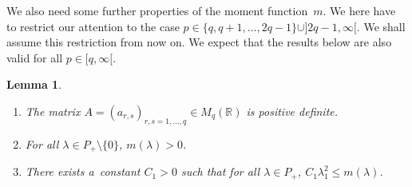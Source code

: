 \documentclass[pdftex]{sigma}
\numberwithin{equation}{section}
\newtheorem{Lemma}[Theorem]{Lemma}
\begin{document}
We also need some further properties of the moment function~$m$.
We here have to restrict our attention to the case $p\in \{q,q+1,\ldots,2q-1\}\cup]2q-1,\infty[$.
We shall assume this restriction from now on.
We expect that the results below are also valid for all $p\in[q,\infty[$.

\begin{Lemma}\label{quad-wachstum}\qquad
\begin{enumerate}\itemsep=0pt
\item[$(1)$] The matrix $A=(a_{r,s})_{r,s=1,\ldots,q}\in M_q(\mathbb R)$ is positive definite.
\item[$(2)$] For all $\lambda\in P_+\setminus\{0\}$, $m(\lambda)>0$.
\item[$(3)$] There exists a~constant $C_1>0$ such that for all $\lambda\in P_+$, $C_1\lambda_1^2\le m(\lambda)$.
\end{enumerate}
\end{Lemma}
\end{document}
